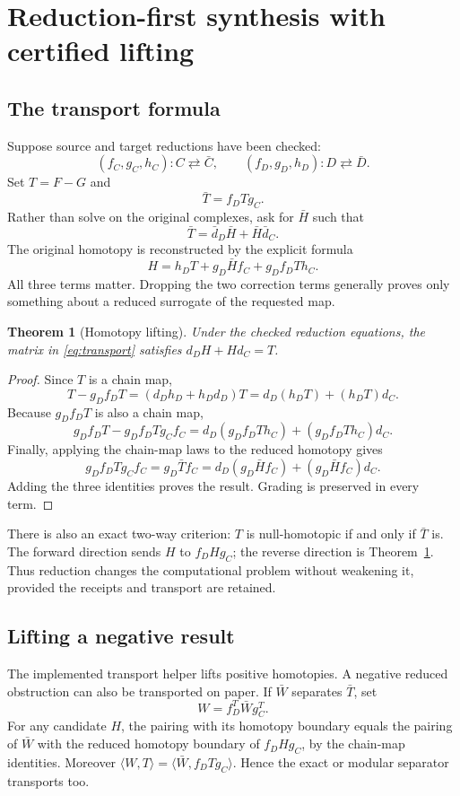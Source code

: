\documentclass[11pt,letterpaper]{article}
\newtheorem{theorem}{Theorem}[section]
\theoremstyle{definition}\newtheorem{definition}[theorem]{Definition}
\theoremstyle{remark}\newtheorem{remark}[theorem]{Remark}
\newcommand{\pair}[2]{\langle #1,#2\rangle}
\begin{document}
\section{Reduction-first synthesis with certified lifting}
\label{sec:transport}

\subsection{The transport formula}
Suppose source and target reductions have been checked:
\[
 (f_C,g_C,h_C):C\rightleftarrows\bar C,\qquad
 (f_D,g_D,h_D):D\rightleftarrows\bar D.
\]
Set $T=F-G$ and
\[
 \bar T=f_DTg_C.
\]
Rather than solve on the original complexes, ask for $\bar H$ such that
\[
 \bar T=\bar d_D\bar H+\bar H\bar d_C.
\]
The original homotopy is reconstructed by the explicit formula
\begin{equation}\label{eq:transport}
 H=h_DT+g_D\bar Hf_C+g_Df_DT h_C.
\end{equation}
All three terms matter. Dropping the two correction terms generally proves only
something about a reduced surrogate of the requested map.

\begin{theorem}[Homotopy lifting]\label{thm:lift}
Under the checked reduction equations, the matrix in
\eqref{eq:transport} satisfies $d_DH+Hd_C=T$.
\end{theorem}
\begin{proof}
Since $T$ is a chain map,
\[
 T-g_Df_DT=(d_Dh_D+h_Dd_D)T
          =d_D(h_DT)+(h_DT)d_C.
\]
Because $g_Df_DT$ is also a chain map,
\[
 g_Df_DT-g_Df_DTg_Cf_C
 =d_D(g_Df_DT h_C)+(g_Df_DT h_C)d_C.
\]
Finally, applying the chain-map laws to the reduced homotopy gives
\[
 g_Df_DTg_Cf_C=g_D\bar T f_C
 =d_D(g_D\bar Hf_C)+(g_D\bar Hf_C)d_C.
\]
Adding the three identities proves the result. Grading is preserved in every
term.
\end{proof}

There is also an exact two-way criterion: $T$ is null-homotopic if and only if
$\bar T$ is. The forward direction sends $H$ to $f_DHg_C$; the reverse direction
is Theorem~\ref{thm:lift}. Thus reduction changes the computational problem
without weakening it, provided the receipts and transport are retained.

\subsection{Lifting a negative result}
The implemented transport helper lifts positive homotopies. A negative reduced
obstruction can also be transported on paper. If $\bar W$ separates $\bar T$,
set
\begin{equation}\label{eq:dual-transport}
 W=f_D^T\bar Wg_C^T.
\end{equation}
For any candidate $H$, the pairing with its homotopy boundary equals the pairing
of $\bar W$ with the reduced homotopy boundary of $f_DHg_C$, by the chain-map
identities. Moreover $\pair{W}{T}=\pair{\bar W}{f_DTg_C}$. Hence the exact or
modular separator transports too.
\end{document}
